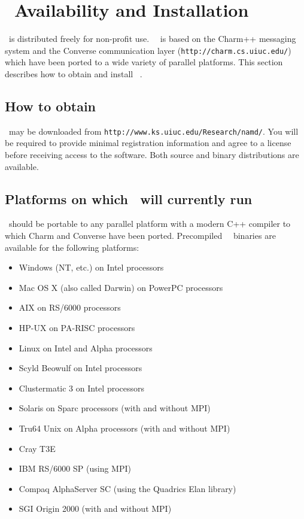 
\section{\NAMD\ Availability and Installation}
\label{section:avail}

\NAMD\ is distributed freely for non-profit use.
\NAMD\ \NAMDVER\ is based on the Charm++ messaging system and the
Converse communication layer ({\tt http://charm.cs.uiuc.edu/})
which have been ported to a wide variety of parallel platforms.
This section describes how to obtain and install \NAMD\ \NAMDVER.

\subsection{How to obtain \NAMD}

\NAMD\ may be downloaded from {\tt http://www.ks.uiuc.edu/Research/namd/}.
You will be required to provide minimal registration information and
agree to a license before receiving access to the software.
Both source and binary distributions are available.

\subsection{Platforms on which \NAMD\ will currently run}
\NAMD\ should be portable to any parallel platform with a
modern C++ compiler to which Charm and Converse have been ported.
Precompiled \NAMD\ \NAMDVER\ binaries are available for the following platforms:  
\begin{itemize}
\item Windows (NT, etc.) on Intel processors 
\item Mac OS X (also called Darwin) on PowerPC processors
\item AIX on RS/6000 processors 
\item HP-UX on PA-RISC processors 
\item Linux on Intel and Alpha processors 
\item Scyld Beowulf on Intel processors 
\item Clustermatic 3 on Intel processors 
\item Solaris on Sparc processors (with and without MPI)
\item Tru64 Unix on Alpha processors (with and without MPI)
\item Cray T3E 
\item IBM RS/6000 SP (using MPI)
\item Compaq AlphaServer SC (using the Quadrics Elan library)
\item SGI Origin 2000 (with and without MPI) 
\end{itemize}

